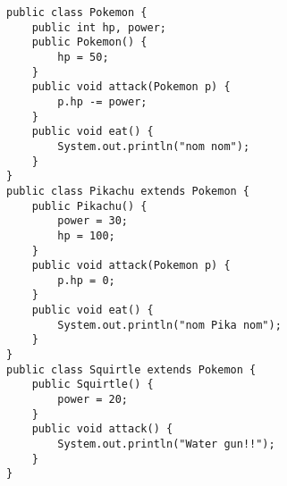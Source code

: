 \begin{lstlisting}
public class Pokemon {
    public int hp, power;
    public Pokemon() {
        hp = 50;
    }
    public void attack(Pokemon p) {
        p.hp -= power;
    }
    public void eat() {
        System.out.println("nom nom");
    }
}
public class Pikachu extends Pokemon {
    public Pikachu() {
        power = 30;
        hp = 100;
    }
    public void attack(Pokemon p) {
        p.hp = 0;
    }
    public void eat() {
        System.out.println("nom Pika nom");
    }
}
public class Squirtle extends Pokemon {
    public Squirtle() {
        power = 20;
    }
    public void attack() {
        System.out.println("Water gun!!");
    }
}
\end{lstlisting}